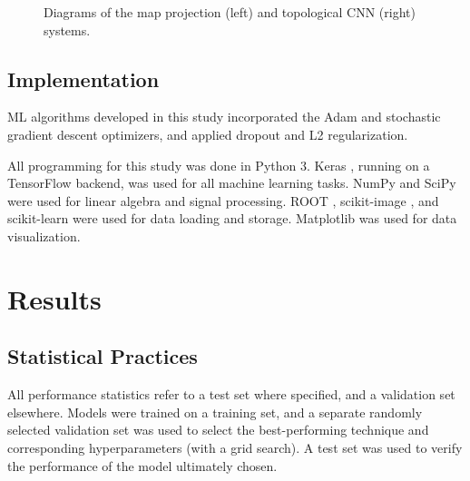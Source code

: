 \documentclass[12pt]{article}
\begin{document}
\begin{figure}[ht]
    \centering
    \qquad
    \caption{Diagrams of the map projection (left) and topological CNN (right) systems.}
\end{figure}

\subsection{Implementation}

ML algorithms developed in this study incorporated the Adam \cite{adam} and stochastic gradient descent \cite{sgd} optimizers, and applied dropout \cite{dropout} and L2 regularization.

All programming for this study was done in Python 3. Keras \cite{keras}, running on a TensorFlow \cite{tensorflow} backend, was used for all machine learning tasks. NumPy \cite{numpy} and SciPy \cite{scipy} were used for linear algebra and signal processing. ROOT \cite{root}, scikit-image \cite{scikit-image}, and scikit-learn \cite{scikit-learn} were used for data loading and storage. Matplotlib \cite{matplotlib} was used for data visualization.

\section{Results}

\subsection{Statistical Practices}

All performance statistics refer to a test set where specified, and a validation set elsewhere. Models were trained on a training set, and a separate randomly selected validation set was used to select the best-performing technique and corresponding hyperparameters (with a grid search). A test set was used to verify the performance of the model ultimately chosen.
\end{document}
